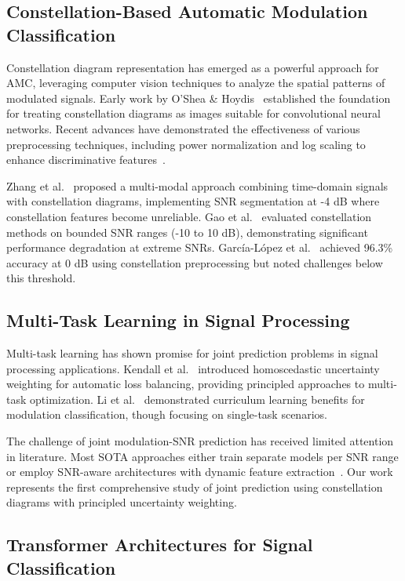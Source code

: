\documentclass{ELSP}
\begin{document}
\subsection{Constellation-Based Automatic Modulation Classification}

Constellation diagram representation has emerged as a powerful approach for AMC, leveraging computer vision techniques to analyze the spatial patterns of modulated signals. Early work by O'Shea \& Hoydis~\cite{oshea2017} established the foundation for treating constellation diagrams as images suitable for convolutional neural networks. Recent advances have demonstrated the effectiveness of various preprocessing techniques, including power normalization and log scaling to enhance discriminative features~\cite{mendis2019,wang2020}.

Zhang et al.~\cite{zhang2023multimodal} proposed a multi-modal approach combining time-domain signals with constellation diagrams, implementing SNR segmentation at -4 dB where constellation features become unreliable. Gao et al.~\cite{gao2023robust} evaluated constellation methods on bounded SNR ranges (-10 to 10 dB), demonstrating significant performance degradation at extreme SNRs. García-López et al.~\cite{garcia2024ultralight} achieved 96.3\% accuracy at 0 dB using constellation preprocessing but noted challenges below this threshold.

\subsection{Multi-Task Learning in Signal Processing}

Multi-task learning has shown promise for joint prediction problems in signal processing applications. Kendall et al.~\cite{kendall2018multitask} introduced homoscedastic uncertainty weighting for automatic loss balancing, providing principled approaches to multi-task optimization. Li et al.~\cite{li2019curriculum} demonstrated curriculum learning benefits for modulation classification, though focusing on single-task scenarios.

The challenge of joint modulation-SNR prediction has received limited attention in literature. Most SOTA approaches either train separate models per SNR range or employ SNR-aware architectures with dynamic feature extraction~\cite{liu2020survey}. Our work represents the first comprehensive study of joint prediction using constellation diagrams with principled uncertainty weighting.

\subsection{Transformer Architectures for Signal Classification}
\end{document}
